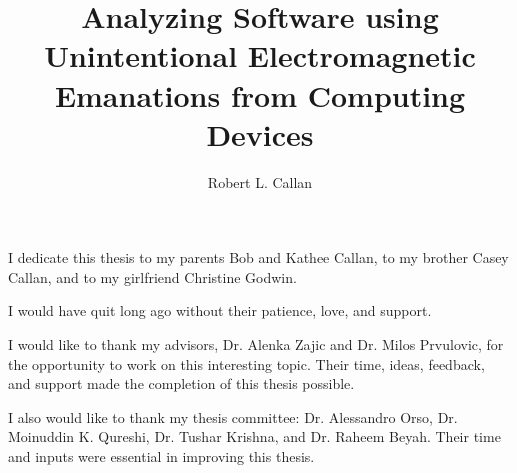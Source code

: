 \documentclass[12pt]{gatech-thesis}
\title{Analyzing Software using Unintentional Electromagnetic Emanations from Computing Devices} %
\author{Robert L. Callan}
\begin{document}



\newcommand{\SAVATfull}[0] {Signal Available to Attacker\xspace}
\newcommand{\SAVAT}[0] {SAVAT\xspace}
\newcommand{\zop}{\textsc{ZOP}\xspace}

\begin{preliminary}
\begin{dedication}
  I dedicate this thesis to my parents Bob and Kathee Callan, to my brother Casey Callan, and to my girlfriend Christine Godwin.

  I would have quit long ago without their patience, love, and support. 
\end{dedication}


\begin{acknowledgements}
  I would like to thank my advisors, Dr. Alenka Zajic and Dr. Milos Prvulovic, for the opportunity to work on this interesting topic. Their time, ideas, feedback, and support made the completion of this thesis possible.

  I also would like to thank my thesis committee:  Dr. Alessandro Orso, Dr. Moinuddin K. Qureshi, Dr. Tushar Krishna, and Dr. Raheem Beyah. Their time and inputs were essential in improving this thesis.
\end{acknowledgements}
\contents








\begin{summary}


\end{summary}
\end{preliminary}
\end{document}
